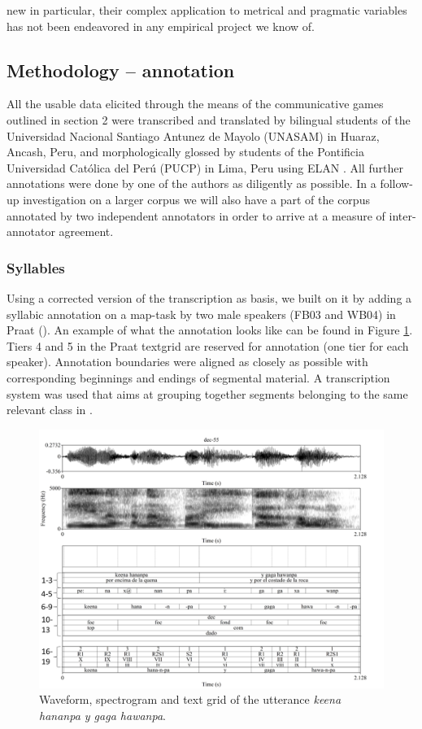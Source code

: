 \documentclass[output=paper]{LSP/langsci}
\begin{document}
new in particular, their complex application to metrical and pragmatic variables has not been endeavored in any empirical  project we know of.

\subsection{Methodology – annotation} 
All the usable  data elicited through the means of the communicative games outlined in section 2 were transcribed and translated by bilingual students of the Universidad Nacional Santiago Antunez de Mayolo (UNASAM) in Huaraz, Ancash, Peru, and morphologically glossed by students of the Pontificia Universidad Católica del Perú (PUCP) in Lima, Peru using {ELAN} \citep{Wittenburg2006}. All further annotations were done by one of the authors as diligently as possible. In a follow-up investigation on a larger corpus we will also have a part of the corpus annotated by two independent annotators in order to arrive at a measure of inter-annotator agreement. 

\subsubsection{Syllables} 
Using a corrected version of the transcription as basis, we built on it by adding a syllabic annotation on a map-task by two male speakers (FB03 and WB04) in {Praat} (\citealt{Boersma.praat}). An example of what the  annotation looks like can be found in Figure \ref{fig:buc:1}. Tiers 4 and 5 in the {Praat} textgrid are reserved for  annotation (one tier for each speaker). Annotation boundaries were aligned as closely as possible with corresponding beginnings and endings of segmental material. A transcription system was used that aims at grouping together segments belonging to the same relevant class in . 

\begin{figure}  
\includegraphics[width=\textwidth]{figures/BUC-img1small_numbered.png}
\caption{Waveform, spectrogram and text grid of the utterance \textit{keena hananpa y gaga hawanpa}.}
\label{fig:buc:1}
\end{figure}
\end{document}
